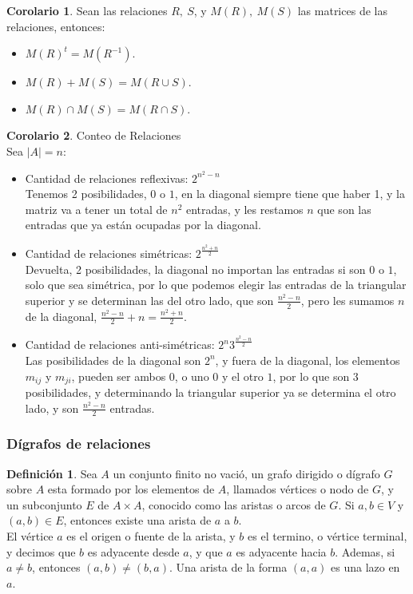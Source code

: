\documentclass[10pt]{article}
\theoremstyle{definition}
\newtheorem{definition}{Definición}[section]
\newtheorem{corollary}{Corolario}[theorem]
\begin{document}
    \begin{corollary}
        Sean las relaciones $R,\ S$, y $M(R),\ M(S)$ las matrices de las relaciones, entonces:
        \begin{itemize}
            \item $M(R)^t=M(R^{-1})$.
            \item $M(R)+M(S)=M(R\cup S)$.
            \item $M(R)\cap M(S)=M(R\cap S)$.
        \end{itemize}
    \end{corollary}
    \begin{corollary}{Conteo de Relaciones}
        \\Sea $|A|=n$:
        \begin{itemize}
            \item Cantidad de relaciones reflexivas: $2^{n^2-n}$\\Tenemos 2 posibilidades, $0$ o $1$, en la diagonal siempre tiene que haber 1, y la matriz va a tener un total de $n^2$ entradas, y les restamos $n$ que son las entradas que ya están ocupadas por la diagonal.
            \item Cantidad de relaciones simétricas: $2^{\frac{n^2+n}{2}}$\\Devuelta, 2 posibilidades, la diagonal no importan las entradas si son $0$ o $1$, solo que sea simétrica, por lo que podemos elegir las entradas de la triangular superior y se determinan las del otro lado, que son $\frac{n^2-n}{2}$, pero les sumamos $n$ de la diagonal, $\frac{n^2-n}{2}+n=\frac{n^2+n}{2}$.
            \item Cantidad de relaciones anti-simétricas: $2^n3^{\frac{n^2-n}{2}}$\\Las posibilidades de la diagonal son $2^n$, y fuera de la diagonal, los elementos $m_{ij}$ y $m_{ji}$, pueden ser ambos $0$, o uno $0$ y el otro $1$, por lo que son 3 posibilidades, y determinando la triangular superior ya se determina el otro lado, y son $\frac{n^2-n}{2}$ entradas.
        \end{itemize}
    \end{corollary}
    \subsubsection{Dígrafos de relaciones}
    \begin{definition}
        Sea $A$ un conjunto finito no vació, un grafo dirigido o dígrafo $G$ sobre $A$ esta formado por los elementos de $A$, llamados vértices o nodo de $G$, y un subconjunto $E$ de $A\times A$, conocido como las aristas o arcos de $G$. Si $a,b\in V$ y $(a,b)\in E$, entonces existe una arista de $a$ a $b$.\\El vértice $a$ es el origen o fuente de la arista, y $b$ es el termino, o vértice terminal, y decimos que $b$ es adyacente desde $a$, y que $a$ es adyacente hacia $b$. Ademas, si $a\neq b$, entonces $(a,b)\neq(b,a)$. Una arista de la forma $(a,a)$ es una lazo en $a$.
    \end{definition}
\end{document}
